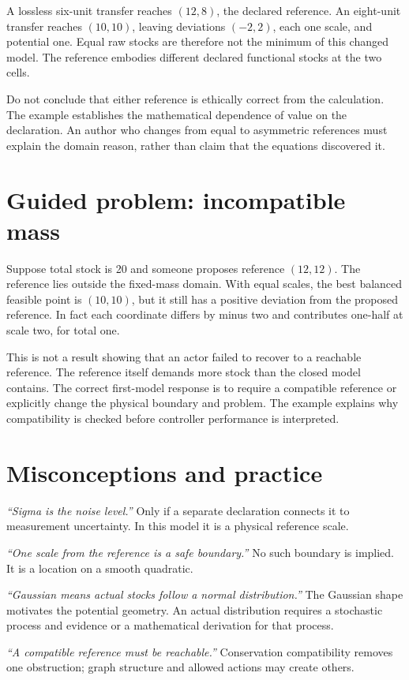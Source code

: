A lossless six-unit transfer reaches \((12,8)\), the declared reference. An eight-unit transfer reaches \((10,10)\), leaving deviations \((-2,2)\), each one scale, and potential one. Equal raw stocks are therefore not the minimum of this changed model. The reference embodies different declared functional stocks at the two cells.

Do not conclude that either reference is ethically correct from the calculation. The example establishes the mathematical dependence of value on the declaration. An author who changes from equal to asymmetric references must explain the domain reason, rather than claim that the equations discovered it.

\section{Guided problem: incompatible mass}
Suppose total stock is 20 and someone proposes reference \((12,12)\). The reference lies outside the fixed-mass domain. With equal scales, the best balanced feasible point is \((10,10)\), but it still has a positive deviation from the proposed reference. In fact each coordinate differs by minus two and contributes one-half at scale two, for total one.

This is not a result showing that an actor failed to recover to a reachable reference. The reference itself demands more stock than the closed model contains. The correct first-model response is to require a compatible reference or explicitly change the physical boundary and problem. The example explains why compatibility is checked before controller performance is interpreted.

\section{Misconceptions and practice}
\emph{``Sigma is the noise level.''} Only if a separate declaration connects it to measurement uncertainty. In this model it is a physical reference scale.

\emph{``One scale from the reference is a safe boundary.''} No such boundary is implied. It is a location on a smooth quadratic.

\emph{``Gaussian means actual stocks follow a normal distribution.''} The Gaussian shape motivates the potential geometry. An actual distribution requires a stochastic process and evidence or a mathematical derivation for that process.

\emph{``A compatible reference must be reachable.''} Conservation compatibility removes one obstruction; graph structure and allowed actions may create others.

